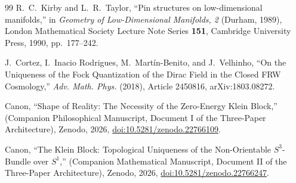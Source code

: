 \documentclass[11pt]{article}
\theoremstyle{canonmath}
\theoremstyle{canonpostulate}
\theoremstyle{canonclaim}
\begin{document}
\begin{thebibliography}{99}
R.~C.~Kirby and L.~R.~Taylor, ``Pin structures on low-dimensional manifolds,'' in \textit{Geometry of Low-Dimensional Manifolds, 2} (Durham, 1989), London Mathematical Society Lecture Note Series \textbf{151}, Cambridge University Press, 1990, pp.~177--242.

J.~Cortez, I.~Inaci{o} Rodrigues, M.~Mart\'in-Benito, and J.~Velhinho, ``On the Uniqueness of the Fock Quantization of the Dirac Field in the Closed FRW Cosmology,'' \textit{Adv. Math. Phys.} (2018), Article 2450816, arXiv:1803.08272.

Canon, ``Shape of Reality: The Necessity of the Zero-Energy Klein Block,'' (Companion Philosophical Manuscript, Document I of the Three-Paper Architecture), Zenodo, 2026, \href{https://doi.org/10.5281/zenodo.22766109}{doi:10.5281/zenodo.22766109}.

Canon, ``The Klein Block: Topological Uniqueness of the Non-Orientable $S^3$-Bundle over $S^1$,'' (Companion Mathematical Manuscript, Document II of the Three-Paper Architecture), Zenodo, 2026, \href{https://doi.org/10.5281/zenodo.22766247}{doi:10.5281/zenodo.22766247}.

\end{thebibliography}
\end{document}
